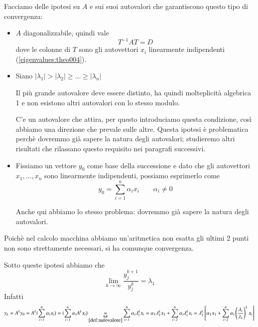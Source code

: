 Facciamo delle ipotesi su $A$ e sui suoi autovalori
che garantiscono questo tipo di convergenza:
\begin{itemize}
\item $A$ diagonalizzabile, quindi vale
  $$ T^{-1}AT = D $$ 
  dove le colonne di $T$ sono gli autovettori $x_i$ linearmente
  indipendenti (\ref{eigenvalues:theo004}).
\item 
  Siano $|\lambda_1| > |\lambda_2| \geq \ldots \geq |\lambda_n| $

  Il pi\`u grande autovalore deve essere distinto, ha quindi
  molteplicit\`a algebrica 1 e non esistono altri autovalori con lo
  stesso modulo.
  \begin{notes}
    C'e un autovalore che attira, per questo introduciamo questa
    condizione, cos\`i abbiamo una direzione che prevale sulle altre. Questa ipotesi \`e
    problematica perch\`e dovremmo gi\`a sapere la natura degli
    autovalori; studieremo altri risultati che rilassano questo requisito nei paragrafi successivi.
  \end{notes}
\item
  Fissiamo un vettore $y_0$ come base della successione e dato che gli
  autovettori $x_1, \ldots, x_n$ sono linearmente indipendenti, possiamo
  esprimerlo come
  $$ y_0 = \displaystyle \sum_{i=1}^{n} \alpha_i x_i \qquad 
  \alpha_i \neq 0 $$
  \begin{notes}
    Anche qui abbiamo lo stesso problema: dovremmo gi\`a sapere la
    natura degli autovalori.
  \end{notes}
\end{itemize}

\begin{notes}
  Poich\`e nel calcolo macchina abbiamo un'aritmetica non esatta gli
  ultimi 2 punti non sono strettamente necessari, si ha comunque
  convergenza.
\end{notes}

Sotto queste ipotesi abbiamo che
$$
\lim_{k \to \infty}  \dfrac{y_j^{k+1}}{y_j^{k}} =  \lambda_1
$$
Infatti
\begin{equation}
  \label{eigenvalues:03}
  y_k = A^{k}y_0 = 
  A^{k} (\displaystyle \sum_{i=1}^{n} \alpha_i x_i) =
  (\sum_{i=1}^{n} \alpha_i A^{k} x_i) \underbracket{=}_{\ref{def:autovalore}}
  \sum_{i=1}^{n} \alpha_i \lambda_i^{k} x_i =
  \alpha_1 \lambda_1^{k} x_1 + \sum_{i=2}^{n} \alpha_i \lambda_i^{k}x_i =
  \lambda_1^{k} \left[ \alpha_1 x_1 +
    \sum_{i=2}^{n} \alpha_i\left(\dfrac{\lambda_i}{\lambda_1}\right)^{k}x_i \right]
\end{equation}

